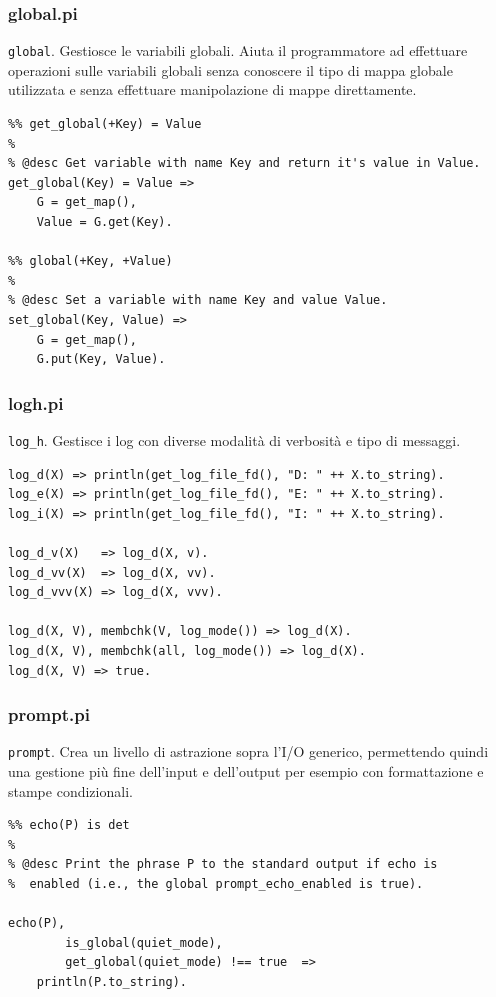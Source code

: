 \documentclass[12pt,a4paper,openright]{book} %
\begin{document}
\subsubsection{global.pi}

\verb|global|. Gestiosce le variabili globali. Aiuta il programmatore ad effettuare operazioni sulle variabili globali senza conoscere il tipo di mappa globale utilizzata e senza effettuare manipolazione di mappe direttamente.

\begin{verbatim}
%% get_global(+Key) = Value
%
% @desc Get variable with name Key and return it's value in Value.
get_global(Key) = Value =>
    G = get_map(),
    Value = G.get(Key).

%% global(+Key, +Value)
%
% @desc Set a variable with name Key and value Value.
set_global(Key, Value) =>
    G = get_map(),
    G.put(Key, Value).
\end{verbatim}

\subsubsection{log\textunderscore h.pi}

\verb|log_h|. Gestisce i log con diverse modalità di verbosità e tipo di messaggi.

\begin{verbatim}
log_d(X) => println(get_log_file_fd(), "D: " ++ X.to_string).
log_e(X) => println(get_log_file_fd(), "E: " ++ X.to_string).
log_i(X) => println(get_log_file_fd(), "I: " ++ X.to_string).

log_d_v(X)   => log_d(X, v).
log_d_vv(X)  => log_d(X, vv).
log_d_vvv(X) => log_d(X, vvv).

log_d(X, V), membchk(V, log_mode()) => log_d(X).
log_d(X, V), membchk(all, log_mode()) => log_d(X).
log_d(X, V) => true.
\end{verbatim}

\subsubsection{prompt.pi}

\verb|prompt|. Crea un livello di astrazione sopra l'I/O generico, permettendo quindi una gestione più fine dell'input e dell'output per esempio con formattazione e stampe condizionali.

\begin{verbatim}
%% echo(P) is det
%
% @desc Print the phrase P to the standard output if echo is 
%  enabled (i.e., the global prompt_echo_enabled is true).

echo(P), 
        is_global(quiet_mode), 
        get_global(quiet_mode) !== true  => 
    println(P.to_string).
\end{verbatim}
\end{document}
